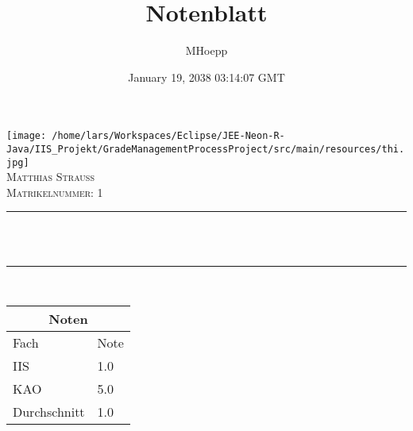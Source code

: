 \documentclass[12pt]{article}
\title{Notenblatt}
\author{MHoepp}
\date{January 19, 2038 03:14:07 GMT}
\makeatletter
\let\thetitle\@title
\makeatother
\begin{document}
   
   
    \begin{titlepage}
        \centering
        \texttt{[image: /home/lars/Workspaces/Eclipse/JEE-Neon-R-Java/IIS\_Projekt/GradeManagementProcessProject/src/main/resources/thi.jpg]}\\[0.5 cm] 
        \textsc{\Large Matthias Strauß}\\[1.0 cm] %
        \textsc{Matrikelnummer: 1}\\[0.25 cm]               %
        \rule{\linewidth}{0.2 mm} \\[0.2 cm]
        { \huge \bfseries \thetitle}\\
        \rule{\linewidth}{0.2 mm} \\[0.75 cm]
       
       
       
        \setlength{\arrayrulewidth}{1mm}
        \setlength{\tabcolsep}{12pt}
        \renewcommand{\arraystretch}{2.5}
        {
            \begin{tabular}{ |p{5cm}|p{1.5cm}|  }
                \hline
                \multicolumn{2}{|c|}{Noten} \\
                \hline
                Fach& Note  \\
                \hline
IIS & 1.0\\

KAO & 5.0\\


               
               
               
                \hline
                Durchschnitt & 1.0  \\
                \hline
            \end{tabular}
        }
       
       
       
       
       
       
       
    \end{titlepage}
   
   
   
\end{document}

